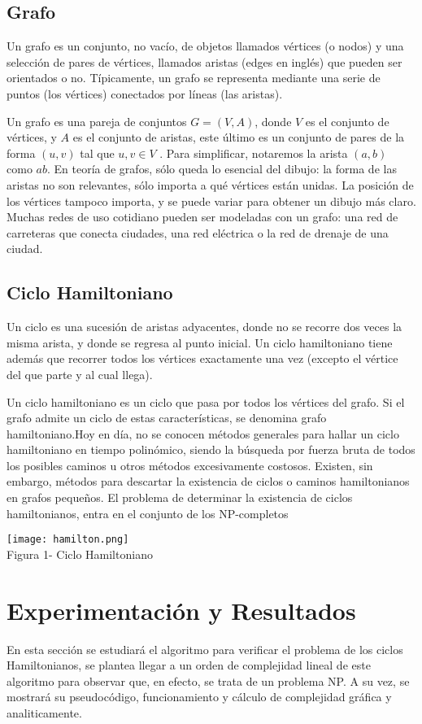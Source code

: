 \documentclass[12pt,twoside]{article}
\begin{document}
\subsection{Grafo}
Un grafo es un conjunto, no vacío, de objetos llamados vértices (o nodos) y una selección de pares de vértices, llamados aristas (edges en inglés) que pueden ser orientados o no. Típicamente, un grafo se representa mediante una serie de puntos (los vértices)
conectados por líneas (las aristas).

Un grafo es una pareja de conjuntos $G = (V,A)$,
donde $V$ es el conjunto de vértices, y $A$ es el
conjunto de aristas, este último es un conjunto de
pares de la forma $(u,v)$ tal que $u,v \in V$ . Para
simplificar, notaremos la arista $(a,b)$ como $ab$.
En teoría de grafos, sólo queda lo esencial del
dibujo: la forma de las aristas no son relevantes, sólo
importa a qué vértices están unidas.  La posición de
los vértices tampoco importa, y se puede variar para obtener un dibujo más claro. Muchas redes de uso cotidiano pueden ser modeladas con un grafo: una red de carreteras que conecta ciudades, una red eléctrica o la red de drenaje de una ciudad.

\subsection{Ciclo Hamiltoniano}
Un ciclo es una sucesión de aristas adyacentes,
donde no se recorre dos veces la misma arista, y
donde se regresa al punto inicial. Un ciclo
hamiltoniano tiene además que recorrer todos los
vértices exactamente una vez (excepto el vértice del
que parte y al cual llega).

Un ciclo hamiltoniano es un ciclo que pasa por todos los vértices del grafo. Si el grafo admite un ciclo de estas características, se denomina grafo hamiltoniano.Hoy en día, no se conocen métodos generales para hallar un ciclo hamiltoniano en tiempo polinómico, siendo la
búsqueda por fuerza bruta de todos los posibles caminos u otros métodos excesivamente costosos. Existen, sin
embargo, métodos para descartar la existencia de ciclos o caminos hamiltonianos en grafos pequeños.
El problema de determinar la existencia de ciclos hamiltonianos, entra en el conjunto de los NP-completos
\begin{center}
    \texttt{[image: hamilton.png]}\\
    Figura 1- Ciclo Hamiltoniano
\end{center}

\section{Experimentaci\'on y Resultados}
En esta sección se estudiará el algoritmo para verificar el problema de los ciclos Hamiltonianos, se plantea llegar a un orden de complejidad lineal de este algoritmo para observar que, en efecto, se trata de un problema NP. A su vez, se mostrará su pseudocódigo, funcionamiento y cálculo de complejidad gráfica y analiticamente.
\end{document}

